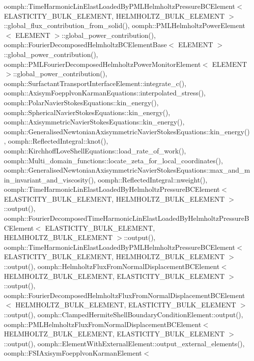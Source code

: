 oomph\+::\+Time\+Harmonic\+Lin\+Elast\+Loaded\+By\+P\+M\+L\+Helmholtz\+Pressure\+B\+C\+Element$<$ E\+L\+A\+S\+T\+I\+C\+I\+T\+Y\+\_\+\+B\+U\+L\+K\+\_\+\+E\+L\+E\+M\+E\+N\+T, H\+E\+L\+M\+H\+O\+L\+T\+Z\+\_\+\+B\+U\+L\+K\+\_\+\+E\+L\+E\+M\+E\+N\+T $>$\+::global\+\_\+flux\+\_\+contribution\+\_\+from\+\_\+solid(), oomph\+::\+P\+M\+L\+Helmholtz\+Power\+Element$<$ E\+L\+E\+M\+E\+N\+T $>$\+::global\+\_\+power\+\_\+contribution(), oomph\+::\+Fourier\+Decomposed\+Helmholtz\+B\+C\+Element\+Base$<$ E\+L\+E\+M\+E\+N\+T $>$\+::global\+\_\+power\+\_\+contribution(), oomph\+::\+P\+M\+L\+Fourier\+Decomposed\+Helmholtz\+Power\+Monitor\+Element$<$ E\+L\+E\+M\+E\+N\+T $>$\+::global\+\_\+power\+\_\+contribution(), oomph\+::\+Surfactant\+Transport\+Interface\+Element\+::integrate\+\_\+c(), oomph\+::\+Axisym\+Foepplvon\+Karman\+Equations\+::interpolated\+\_\+stress(), oomph\+::\+Polar\+Navier\+Stokes\+Equations\+::kin\+\_\+energy(), oomph\+::\+Spherical\+Navier\+Stokes\+Equations\+::kin\+\_\+energy(), oomph\+::\+Axisymmetric\+Navier\+Stokes\+Equations\+::kin\+\_\+energy(), oomph\+::\+Generalised\+Newtonian\+Axisymmetric\+Navier\+Stokes\+Equations\+::kin\+\_\+energy(), oomph\+::\+Reflected\+Integral\+::knot(), oomph\+::\+Kirchhoff\+Love\+Shell\+Equations\+::load\+\_\+rate\+\_\+of\+\_\+work(), oomph\+::\+Multi\+\_\+domain\+\_\+functions\+::locate\+\_\+zeta\+\_\+for\+\_\+local\+\_\+coordinates(), oomph\+::\+Generalised\+Newtonian\+Axisymmetric\+Navier\+Stokes\+Equations\+::max\+\_\+and\+\_\+min\+\_\+invariant\+\_\+and\+\_\+viscosity(), oomph\+::\+Reflected\+Integral\+::nweight(), oomph\+::\+Time\+Harmonic\+Lin\+Elast\+Loaded\+By\+Helmholtz\+Pressure\+B\+C\+Element$<$ E\+L\+A\+S\+T\+I\+C\+I\+T\+Y\+\_\+\+B\+U\+L\+K\+\_\+\+E\+L\+E\+M\+E\+N\+T, H\+E\+L\+M\+H\+O\+L\+T\+Z\+\_\+\+B\+U\+L\+K\+\_\+\+E\+L\+E\+M\+E\+N\+T $>$\+::output(), oomph\+::\+Fourier\+Decomposed\+Time\+Harmonic\+Lin\+Elast\+Loaded\+By\+Helmholtz\+Pressure\+B\+C\+Element$<$ E\+L\+A\+S\+T\+I\+C\+I\+T\+Y\+\_\+\+B\+U\+L\+K\+\_\+\+E\+L\+E\+M\+E\+N\+T, H\+E\+L\+M\+H\+O\+L\+T\+Z\+\_\+\+B\+U\+L\+K\+\_\+\+E\+L\+E\+M\+E\+N\+T $>$\+::output(), oomph\+::\+Time\+Harmonic\+Lin\+Elast\+Loaded\+By\+P\+M\+L\+Helmholtz\+Pressure\+B\+C\+Element$<$ E\+L\+A\+S\+T\+I\+C\+I\+T\+Y\+\_\+\+B\+U\+L\+K\+\_\+\+E\+L\+E\+M\+E\+N\+T, H\+E\+L\+M\+H\+O\+L\+T\+Z\+\_\+\+B\+U\+L\+K\+\_\+\+E\+L\+E\+M\+E\+N\+T $>$\+::output(), oomph\+::\+Helmholtz\+Flux\+From\+Normal\+Displacement\+B\+C\+Element$<$ H\+E\+L\+M\+H\+O\+L\+T\+Z\+\_\+\+B\+U\+L\+K\+\_\+\+E\+L\+E\+M\+E\+N\+T, E\+L\+A\+S\+T\+I\+C\+I\+T\+Y\+\_\+\+B\+U\+L\+K\+\_\+\+E\+L\+E\+M\+E\+N\+T $>$\+::output(), oomph\+::\+Fourier\+Decomposed\+Helmholtz\+Flux\+From\+Normal\+Displacement\+B\+C\+Element$<$ H\+E\+L\+M\+H\+O\+L\+T\+Z\+\_\+\+B\+U\+L\+K\+\_\+\+E\+L\+E\+M\+E\+N\+T, E\+L\+A\+S\+T\+I\+C\+I\+T\+Y\+\_\+\+B\+U\+L\+K\+\_\+\+E\+L\+E\+M\+E\+N\+T $>$\+::output(), oomph\+::\+Clamped\+Hermite\+Shell\+Boundary\+Condition\+Element\+::output(), oomph\+::\+P\+M\+L\+Helmholtz\+Flux\+From\+Normal\+Displacement\+B\+C\+Element$<$ H\+E\+L\+M\+H\+O\+L\+T\+Z\+\_\+\+B\+U\+L\+K\+\_\+\+E\+L\+E\+M\+E\+N\+T, E\+L\+A\+S\+T\+I\+C\+I\+T\+Y\+\_\+\+B\+U\+L\+K\+\_\+\+E\+L\+E\+M\+E\+N\+T $>$\+::output(), oomph\+::\+Element\+With\+External\+Element\+::output\+\_\+external\+\_\+elements(), oomph\+::\+F\+S\+I\+Axisym\+Foepplvon\+Karman\+Element$<$ 